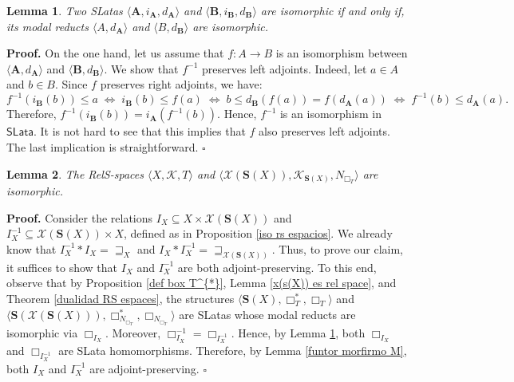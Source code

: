 \documentclass{article}
\newtheorem{lemma}{\bf Lemma}[section]
\newenvironment{proof}
{\par\noindent\textbf{Proof. }\rm}
{\hfill$\boldsymbol{\square}$\par\vspace{0.3cm}}
\begin{document}
\begin{lemma}\label{iso de modal preserva izquierdo}
Two SLatas $\langle \mathbf{A},i_\mathbf{A},d_\mathbf{A}\rangle$ and $\langle \mathbf{B},i_\mathbf{B},d_\mathbf{B}\rangle$ are isomorphic if and only if, its modal reducts $\langle A,d_\mathbf{A}\rangle$ and $\langle B,d_\mathbf{B}\rangle$ are isomorphic.
\end{lemma}
\begin{proof}
On the one hand, let us assume that $f:A\to B$ is an isomorphism between $\langle \mathbf{A},d_\mathbf{A}\rangle$ and $\langle \mathbf{B},d_\mathbf{B}\rangle$. We show that $f^{-1}$ preserves left adjoints. Indeed, let $a\in A$ and $b\in B$. Since $f$ preserves right adjoints, we have:
\[
f^{-1}(i_\mathbf{B}(b))\leq a \;\Leftrightarrow\; i_\mathbf{B}(b)\leq f(a)\;\Leftrightarrow\; b\leq d_\mathbf{B}(f(a))=f(d_\mathbf{A}(a))\;\Leftrightarrow\; f^{-1}(b)\leq d_\mathbf{A}(a).
\]
Therefore, $f^{-1}(i_\mathbf{B}(b)) = i_\mathbf{A}(f^{-1}(b))$. Hence, $f^{-1}$ is an isomorphism in $\mathsf{SLata}$. It is not hard to see that this implies that $f$ also preserves left adjoints. The last implication is straightforward.
\end{proof}


\begin{lemma}\label{iso rel spaces}
The RelS-spaces $\langle X, \mathcal{K}, T \rangle$ and $\langle \mathcal{X}(\mathbf{S}(X)), \mathcal{K}_{\mathbf{S}(X)}, N_{\Box_T} \rangle$ are isomorphic. 
\end{lemma}

\begin{proof}
Consider the relations $I_X\subseteq X \times \mathcal{X}(\mathbf{S}(X))$ and $I_X^{-1}\subseteq \mathcal{X}(\mathbf{S}(X))\times X$, defined as in Proposition \ref{iso rs espacios}. We already know that $I_X^{-1} * I_X = \sqsupseteq_X$ and $I_X * I_X^{-1} = \sqsupseteq_{\mathcal{X}(\mathbf{S}(X))}$. Thus, to prove our claim, it suffices to show that $I_X$ and $I_X^{-1}$ are both adjoint-preserving. To this end, observe that by Proposition \ref{def box T^{*}}, Lemma \ref{x(s(X)) es rel space}, and Theorem \ref{dualidad RS espaces}, the structures $\langle \mathbf{S}(X), \Box_T^{*},\Box_T\rangle$ and $\langle \mathbf{S}(\mathcal{X}(\mathbf{S}(X))), \Box_{N_{\Box_T}}^{*},\Box_{N_{\Box_T}}\rangle$ are SLatas whose modal reducts are isomorphic via $\Box_{I_X}$. Moreover, $\Box_{I_X}^{-1}=\Box_{I_X^{-1}}$. Hence, by Lemma \ref{iso de modal preserva izquierdo}, both $\Box_{I_X}$ and $\Box_{I_X^{-1}}$ are SLata homomorphisms. Therefore, by Lemma \ref{funtor morfirmo M}, both $I_X$ and $I_X^{-1}$ are adjoint-preserving.
\end{proof}
\end{document}

